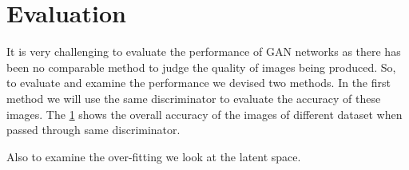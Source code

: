 \begin{table}[H]
\begin{tabular}{|llllll|}
\end{tabular}
\end{table}




\section{Evaluation}

It is very challenging to evaluate the performance of GAN networks as there has been no comparable method to judge the quality of images being produced. So, to evaluate and examine the performance we devised two methods. In the first method we will use the same discriminator to evaluate the accuracy of these images. The \cref{} shows the overall accuracy of the images of different dataset when passed through same discriminator.  


Also to examine the over-fitting we look at the latent space. 